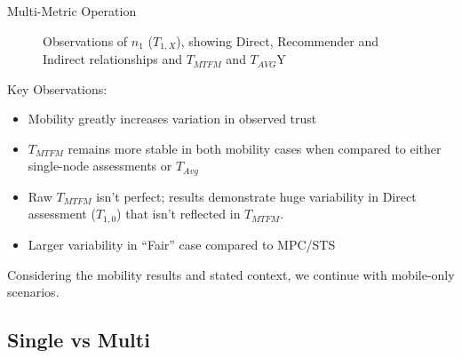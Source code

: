 \documentclass{beamer}
\begin{document}
\begin{frame}[allowframebreaks]{Multi-Metric Operation}
  \label{trust_mobility_summary}
  \setcounter{subfigure}{0}%
  \begin{figure}[htp]
    \centering
    \hfil
    \hfil
    \hfil

    \hfil
    \hfil
    \hfil
    \caption{Observations of $n_1$ ($T_{1,X}$), showing Direct, Recommender and Indirect relationships and $T_{MTFM}$ and $T_{AVG}$Y\hyperlink{fig:trust_mobility_closeup}{}}
    \label{fig:trust_mobility}
  \end{figure}
\framebreak
Key Observations: 
  \begin{itemize}
    \item Mobility greatly increases variation in observed trust
    \item $T_{MTFM}$ remains more stable in both mobility cases when compared to either single-node assessments or $T_{Avg}$
    \item Raw $T_{MTFM}$ isn't perfect; results demonstrate huge variability in Direct assessment ($T_{1,0}$) that isn't reflected in $T_{MTFM}$.
    \item Larger variability in ``Fair'' case compared to MPC/STS
  \end{itemize}
  \centering
  Considering the mobility results and stated context, we continue with mobile-only scenarios.
\end{frame}

\subsection{Single vs Multi}
\end{document}
